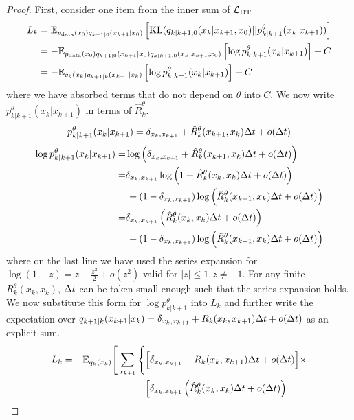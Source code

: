 \documentclass{article}
\begin{document}
\begin{proof}
First, consider one item from the inner sum of $\mathcal{L}_{\textup{DT}}$
\begin{align}
    L_k &= \mathbb{E}_{p_{\textup{data}}(x_0) q_{k+1|0}(x_{k+1} | x_0)} \left[ \text{KL}( q_{k|k+1, 0}(x_k | x_{k+1}, x_0) || p_{k|k+1}^\theta(x_k | x_{k+1}) )\right]\\
    &= - \mathbb{E}_{p_{\textup{data}}(x_0) q_{k+1|0}(x_{k+1} | x_0) q_{k|k+1, 0}(x_k|x_{k+1}, x_0)} \left[ \log p_{k|k+1}^\theta(x_k|x_{k+1})  \right] + C\\
    &= - \mathbb{E}_{q_k(x_k) q_{k+1|k}(x_{k+1}| x_k) } \left[ \log p_{k|k+1}^\theta(x_k| x_{k+1}) \right] + C
\end{align}
where we have absorbed terms that do not depend on $\theta$ into $C$. We now write $p_{k|k+1}^\theta(x_k|x_{k+1})$ in terms of $\hat{R}_k^\theta$.
\begin{equation}
    p_{k|k+1}^\theta(x_k|x_{k+1}) = \delta_{x_k, x_{k+1}} + \hat{R}^\theta_k(x_{k+1}, x_k) \Delta t + o(\Delta t)
\end{equation}
\begin{align}
    \log p_{k|k+1}^\theta(x_k | x_{k+1}) =& \log \left(\delta_{x_k, x_{k+1}} + \hat{R}^\theta_k(x_{k+1}, x_k) \Delta t + o(\Delta t) \right)\\
    =& \delta_{x_k, x_{k+1}} \log \left( 1 + \hat{R}_k^\theta(x_k, x_k) \Delta t + o(\Delta t) \right)\\
    & \, + (1-\delta_{x_k, x_{k+1}}) \log \left( \hat{R}_k^\theta(x_{k+1}, x_k) \Delta t + o(\Delta t) \right)\\
    =& \delta_{x_k, x_{k+1}} \left( \hat{R}_k^\theta(x_k, x_k) \Delta t + o(\Delta t)  \right)\\
    & \, + ( 1 - \delta_{x_k, x_{k+1}} ) \log \left( \hat{R}_k^\theta(x_{k+1}, x_k) \Delta t + o(\Delta t) \right)
    \label{eq:logpkm1kExpansion}
\end{align}
where on the last line we have used the series expansion for $\log(1+z) = z - \frac{z^2}{2} + o(z^2)$ valid for $|z| \leq 1, z \neq -1$. For any finite $R_k^\theta(x_k, x_k)$, $\Delta t$ can be taken small enough such that the series expansion holds. We now substitute this form for $\log p_{k|k+1}^\theta$ into $L_k$ and further write the expectation over $q_{k+1|k}(x_{k+1}|x_k) = \delta_{x_k, x_{k+1}} + R_k(x_k , x_{k+1}) \Delta t + o(\Delta t)$ as an explicit sum.
\begin{align}
    L_k = - \E_{q_k(x_k)} \Bigg[ \sum_{x_{k+1}} \Bigg\{& \Big[ \delta_{x_k, x_{k+1}} + R_k(x_k, x_{k+1}) \dt + o(\dt) \Big] \times \\
    & \Big[ \delta_{x_k, x_{k+1}} \left( \hat{R}_k^\theta(x_k, x_k) \dt + o(\dt)  \right)\\

\end{align}
\end{proof}
\end{document}
